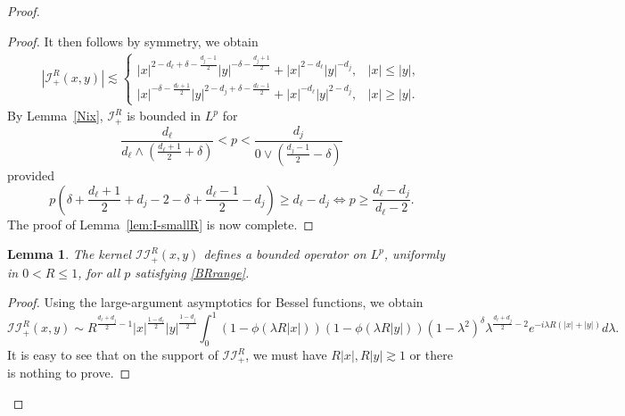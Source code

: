 \documentclass[12pt]{amsart}
\newtheorem{lemma}[theorem]{Lemma}
\begin{document}
\begin{proof}
\begin{proof}
It then follows by symmetry, we obtain 
\begin{align*}
    |\mathcal{I}_+^R(x,y)|\lesssim \begin{cases}
        |x|^{2-d_\ell+\delta-\frac{d_j-1}{2}} |y|^{-\delta-\frac{d_j+1}{2}} + |x|^{2-d_\ell}|y|^{-d_j}, & |x|\le |y|,\\
        |x|^{-\delta-\frac{d_\ell+1}{2}} |y|^{2-d_j+\delta-\frac{d_\ell-1}{2}} + |x|^{-d_\ell} |y|^{2-d_j}, & |x|\ge |y|.
    \end{cases}
\end{align*}
By Lemma~\ref{Nix}, $\mathcal{I}_+^R$ is bounded in $L^p$ for
\begin{equation*}
    \frac{d_\ell}{d_\ell \wedge \left(\frac{d_\ell+1}{2}+\delta\right)} < p < \frac{d_j}{0 \vee \left(\frac{d_j-1}{2} - \delta\right)}
\end{equation*}
provided
\begin{equation*}
    p\left( \delta + \frac{d_\ell+1}{2} + d_j - 2 -\delta + \frac{d_\ell-1}{2} - d_j \right) \ge d_\ell - d_j \iff p \ge \frac{d_\ell-d_j}{d_\ell-2}.
\end{equation*}
The proof of Lemma~\ref{lem:I-smallR} is now complete.

\end{proof}








\begin{lemma}\label{lem:II-smallR}
The kernel \(\mathcal{II}_{+}^R(x,y)\) defines a bounded operator on \(L^p\), uniformly in \(0<R\le 1\), for all \(p\) satisfying \eqref{BRrange}.
\end{lemma}

\begin{proof}
Using the large-argument asymptotics for Bessel functions, we obtain
\begin{equation*}
    \mathcal{II}_{+}^R(x,y)
\sim
R^{\frac{d_\ell+d_j}{2}-1}
|x|^{\frac{1-d_\ell}{2}}|y|^{\frac{1-d_j}{2}}
\int_0^1
(1-\phi(\lambda R|x|))(1-\phi(\lambda R|y|))(1-\lambda^2)^\delta
\lambda^{\frac{d_\ell+d_j}{2}-2}
e^{-i\lambda R(|x|+|y|)} d\lambda.
\end{equation*}
It is easy to see that on the support of $\mathcal{II}_+^R$, we must have $R|x|, R|y| \gtrsim 1$ or there is nothing to prove.


\end{proof}
\end{proof}
\end{document}
